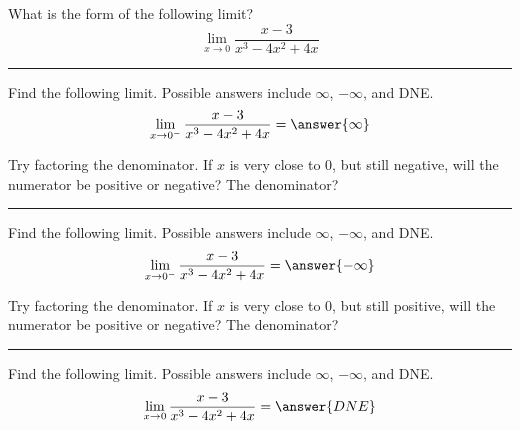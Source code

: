\documentclass{ximera}
\author{Bobby Ramsey}
\begin{document}

\begin{exercise}


What is the form of the following limit?
	\[ \lim_{x\to 0} \frac{x-3}{x^3-4x^2+4x}\]

	\begin{multipleChoice}
	\end{multipleChoice}
	\noindent\rule[0.5ex]{\linewidth}{0.2pt}

	\begin{exercise}
		Find the following limit.  Possible answers include $\infty$, $-\infty$, and DNE.
		\[ \lim_{x\to0^-}\frac{x-3}{x^3-4x^2+4x} = \answer{\infty} \]
		\begin{hint} Try factoring the denominator.   If $x$ is very close to $0$, but still negative, will the numerator be positive or negative?  The denominator?\end{hint}
		\noindent\rule[0.5ex]{\linewidth}{0.2pt}
	
		\begin{exercise}
			Find the following limit.  Possible answers include $\infty$, $-\infty$, and DNE.
			\[ \lim_{x\to0^-}\frac{x-3}{x^3-4x^2+4x} = \answer{-\infty} \]
			\begin{hint} Try factoring the denominator.   If $x$ is very close to $0$, but still positive, will the numerator be positive or negative?  The denominator?\end{hint}
			\noindent\rule[0.5ex]{\linewidth}{0.2pt}
			
			\begin{exercise}
				Find the following limit.  Possible answers include $\infty$, $-\infty$, and DNE.
				\[ \lim_{x\to0}\frac{x-3}{x^3-4x^2+4x} = \answer{DNE} \]
			\end{exercise}
		\end{exercise}
	\end{exercise}
\end{exercise}
\end{document}
